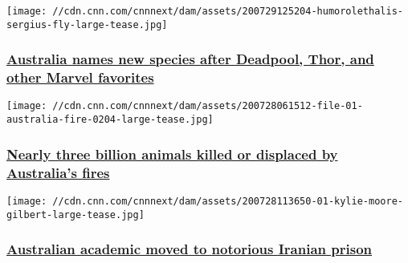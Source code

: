 \href{/2020/07/29/australia/australia-marvel-flies-intl-hnk-scli-scn/index.html}{}

\texttt{[image: //cdn.cnn.com/cnnnext/dam/assets/200729125204-humorolethalis-sergius-fly-large-tease.jpg]}

\hypertarget{australia-names-new-species-after-deadpool-thor-and-other-marvel-favorites}{%
\subsubsection{\texorpdfstring{\href{/2020/07/29/australia/australia-marvel-flies-intl-hnk-scli-scn/index.html}{Australia
names new species after Deadpool, Thor, and other Marvel
favorites}}{Australia names new species after Deadpool, Thor, and other Marvel favorites}}\label{australia-names-new-species-after-deadpool-thor-and-other-marvel-favorites}}

\href{/2020/07/28/asia/australia-fires-wildlife-report-scli-intl-scn/index.html}{}

\texttt{[image: //cdn.cnn.com/cnnnext/dam/assets/200728061512-file-01-australia-fire-0204-large-tease.jpg]}

\hypertarget{nearly-three-billion-animals-killed-or-displaced-by-australias-fires}{%
\subsubsection{\texorpdfstring{\href{/2020/07/28/asia/australia-fires-wildlife-report-scli-intl-scn/index.html}{Nearly
three billion animals killed or displaced by Australia's
fires}}{Nearly three billion animals killed or displaced by Australia's fires}}\label{nearly-three-billion-animals-killed-or-displaced-by-australias-fires}}

\href{/2020/07/28/middleeast/kylie-moore-gilbert-iran-prison-moved-intl-scli/index.html}{}

\texttt{[image: //cdn.cnn.com/cnnnext/dam/assets/200728113650-01-kylie-moore-gilbert-large-tease.jpg]}

\hypertarget{australian-academic-moved-to-notorious-iranian-prison}{%
\subsubsection{\texorpdfstring{\href{/2020/07/28/middleeast/kylie-moore-gilbert-iran-prison-moved-intl-scli/index.html}{Australian
academic moved to notorious Iranian
prison}}{Australian academic moved to notorious Iranian prison}}\label{australian-academic-moved-to-notorious-iranian-prison}}

